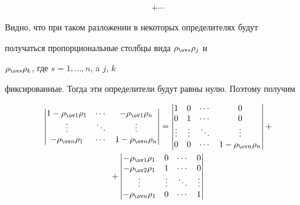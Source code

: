 \begin{pf}
\begin{gather*}
+\dotsb 


\end{gather*} 


 


Видно, что при таком разложении в некоторых определителях будут 


получаться пропорциональные столбцы вида $\rho_{\ov s}\rho_j$ и 


$\rho_{\ov s}\rho_k$, где $s=1,\dotsc,n$, a $j$, $k$ 


фиксированные. Тогда эти определители будут равны нулю. Поэтому получим 


\begin{gather*} 


\begin{vmatrix} 


1-\rho_{\ov 1}\rho_1 & \dotsb & -\rho_{\ov 1}\rho_n \\ 


\vdots & \ddots & \vdots \\ 


-\rho_{\ov n}\rho_1 & \dotsb & 1-\rho_{\ov n}\rho_n 


\end{vmatrix} 


= 


\begin{vmatrix} 


1 & 0 & \dotsb & 0 \\ 


0 & 1 & \dotsb & 0 \\


\vdots & \vdots & \ddots & \vdots \\ 


0 & 0 & \dotsb & 1-\rho_{\ov n}\rho_n 


\end{vmatrix} 


+ \\ 


% 


+ 


\begin{vmatrix} 


-\rho_{\ov 1}\rho_1 & 0 & \dotsb & 0 \\ 


-\rho_{\ov 2}\rho_1 & 1 & \dotsb & 0 \\ 


\vdots & \vdots &\ddots & \vdots \\ 


-\rho_{\ov n}\rho_1 & 0 & \dotsb & 1 



\end{vmatrix}
\end{gather*}
\end{pf}
